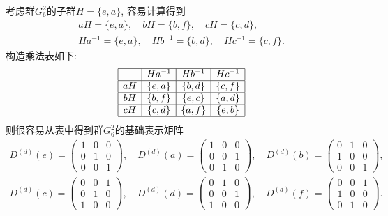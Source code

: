 \documentclass[UTF8]{ctexart}
\begin{document}
考虑群$G_6^2$的子群$H = \{e, a\}$, 容易计算得到
\begin{gather}
  a H = \{e, a\}, \quad b H = \{b, f\}, \quad c H = \{c, d\}, \\
  H a^{-1} = \{e, a\}, \quad H b^{-1} = \{b, d\}, \quad H c^{-1} = \{c, f\}.
\end{gather}
构造乘法表如下:
\begin{equation}
  \begin{array}{|c|c|c|c|}
    \hline
      & H a^{-1} & H b^{-1} & H c^{-1} \\
    \hline
    aH & \{e, a\} & \{b, d\} & \{c, f\} \\
    \hline
    bH & \{b, f\} & \{e, c\} & \{a, d\} \\
    \hline
    cH & \{c, d\} & \{a, f\} & \{e, b\} \\
    \hline
  \end{array}
\end{equation}
则很容易从表中得到群$G_6^2$的基础表示矩阵
\begin{gather}
  D^{(d)}(e) =
  \begin{pmatrix}
    1 & 0 & 0 \\
    0 & 1 & 0 \\
    0 & 0 & 1 
  \end{pmatrix}, \quad D^{(d)}(a) = 
  \begin{pmatrix}
    1 & 0 & 0 \\
    0 & 0 & 1 \\
    0 & 1 & 0 
  \end{pmatrix}, \quad D^{(d)}(b) =
  \begin{pmatrix}
    0 & 1 & 0 \\
    1 & 0 & 0 \\
    0 & 0 & 1
  \end{pmatrix}, \\
  D^{(d)}(c) =
  \begin{pmatrix}
    0 & 0 & 1 \\
    0 & 1 & 0 \\
    1 & 0 & 0 
  \end{pmatrix}, \quad D^{(d)}(d) = 
  \begin{pmatrix}
    0 & 1 & 0 \\
    0 & 0 & 1 \\
    1 & 0 & 0 
  \end{pmatrix}, \quad D^{(d)}(f) =
  \begin{pmatrix}
    0 & 0 & 1 \\
    1 & 0 & 0 \\
    0 & 1 & 0
  \end{pmatrix}.
\end{gather}
\end{document}
